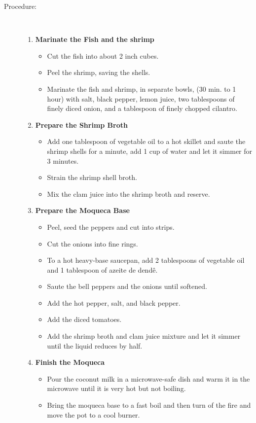 \documentclass[11pt,letterpaper]{article}
\begin{document}
\begin{description}
\item[Procedure:]\ \\
	\begin{enumerate}
	\item {\bf Marinate the Fish and the shrimp}
	\begin{itemize}
	\item Cut the fish into about 2 inch cubes.
	\item Peel the shrimp, saving the shells.
	\item Marinate the fish and shrimp, in separate bowls, (30 min. to 1 hour) with salt, black pepper, 
              lemon juice, two tablespoons of finely diced onion, and a tablespoon 
              of finely chopped cilantro.
	\end{itemize}
	\item {\bf Prepare the Shrimp Broth}
	\begin{itemize}
	\item Add one tablespoon of vegetable oil to a hot skillet 
              and saute the shrimp shells for a minute, add 1 cup of water and let it simmer for 3 minutes.
	\item Strain the shrimp shell broth.
	\item Mix the clam juice into the shrimp broth and reserve.
	\end{itemize}
	\item {\bf Prepare the Moqueca Base}
	\begin{itemize}
	\item Peel, seed the peppers and cut into strips.
	\item Cut the onions into fine rings.
	\item To a hot heavy-base saucepan, add 2 tablespoons of vegetable oil 
              and 1 tablespoon of azeite de dend\^e.
	\item Saute the bell peppers and the onions until softened.
	\item Add the hot pepper, salt, and black pepper.
	\item Add the diced tomatoes.
	\item Add the shrimp broth and clam juice mixture and let it simmer until the liquid reduces by half.
	\end{itemize}
	\item {\bf Finish the Moqueca}
	\begin{itemize}
	\item Pour the coconut milk in a microwave-safe dish and warm it in the microwave until it is very hot but not boiling.
	\item Bring the moqueca base to a fast boil and then turn of the fire and move the pot to a cool burner.

\end{itemize}
\end{enumerate}
\end{description}
\end{document}
